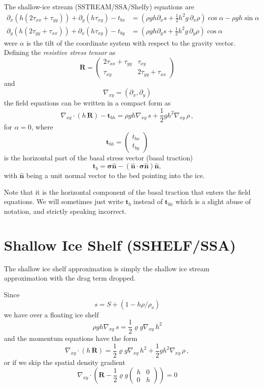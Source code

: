 \documentclass[10pt,a4paper]{book}
\newcommand{\p}{\partial}
\newcommand{\tbx}{t_{bx}}
\newcommand{\tby}{t_{by}}
\newcommand{\txx}{\tau_{xx}}
\newcommand{\tyy}{\tau_{yy}}
\newcommand{\txy}{\tau_{xy}}
\newcommand{\normal}{\hat{\bm{n}}}
\begin{document}
The shallow-ice stream (SSTREAM/SSA/Shelfy) equations are
\begin{align} 
\p_x ( h ( 2 \txx + \tyy)) +\p_y ( h \txy) - \tbx
&=(\rho g h \p_x s +\frac{1}{2} h^2 g  \, \p_x \rho ) \cos \alpha-\rho g h \sin \alpha
\label{eq:stressx}\\
\p_y (  h ( 2 \tyy + \txx)) +\p_x ( h \txy ) - \tby
&=(\rho g h \p_y s  +\frac{1}{2} h^2 g \, \p_y \rho ) \cos \alpha
\label{eq:stressy}
\end{align}
were $\alpha$ is the tilt of the coordinate system with respect to the
gravity vector. Defining the {\em resistive stress tensor} as
\begin{equation}
\bm{R}=\begin{pmatrix} 2 \txx+\tyy & \txy \\ \txy & 2 \tyy + \txx \end{pmatrix}
\label{eq:defSigmah}
\end{equation}
and
\[
\nabla_{xy} = (\p_x , \p_y)
\]
the field equations can be written in a compact form as
\begin{equation}
\nabla_{xy} \cdot (h \, \bm{R}) - \bm{t}_{bh} = \rho g h \nabla_{xy}  \, s  + \frac{1}{2} g h^2 \nabla_{xy} \, \rho \, ,
\label{eq:FEao}
\end{equation}
for $\alpha=0$, where
\[
\bm{t}_{bh}= \left ( \begin{array}{c} \tbx \\ \tby \end{array} \right )
\]
is the horizontal part of the basal stress vector (basal traction) 
\[
\bm{t}_b=\bm{\sigma}
\normal-(\normal \cdot \bm{\sigma} \normal) \normal ,\] 
with $\normal$ being a unit normal vector to the bed pointing into the
ice.

Note that it is the horizontal component of the basal traction that
enters the field equations. We will sometimes just write $\bm{t}_b$
instead of $\bm{t}_{bh}$ which is a slight abuse of notation, and
strictly speaking incorrect. 

\section{Shallow Ice Shelf (SSHELF/SSA)}


The shallow ice shelf approximation is simply the shallow ice stream
approximation with the drag term dropped. 

Since 
\[
s= S+(1-h \rho/\rho_o )
\]
we have over a floating ice shelf
\[
  \rho g h \nabla_{xy}  \, s  =   \frac{1}{2} \varrho g  \nabla_{xy}  \, h^2  
\]
and the momentum equations have the form
\begin{equation}
\nabla_{xy} \cdot (h \, \bm{R}) =  \frac{1}{2} \varrho g  \nabla_{xy}  \, h^2   + \frac{1}{2} g h^2 \nabla_{xy} \, \rho \, ,
\label{eq:FEao2}
\end{equation}
or if we skip the spatial density gradient
\begin{equation}
\nabla_{xy} \cdot \left (  \bm{R} 
-  \frac{1}{2} \varrho g   \begin{pmatrix} h & 0 \\ 0 & h \end{pmatrix}  \right ) = 0
\end{equation}
\end{document}
